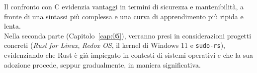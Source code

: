 Il confronto con C evidenzia vantaggi in termini di sicurezza e mantenibilità, a fronte di una sintassi più complessa 
e una curva di apprendimento più ripida e lenta. \hfill 
\vspace{8pt}\\
\noindent Nella seconda parte (Capitolo~\ref{cap:05}), verranno presi in considerazioni progetti concreti (\textit{Rust for Linux}, \textit{Redox OS}, il kernel di Windows 11 e \texttt{sudo-rs}), 
evidenziando che Rust è già impiegato in contesti di sistemi operativi e che la sua adozione procede, seppur gradualmente, in maniera significativa.